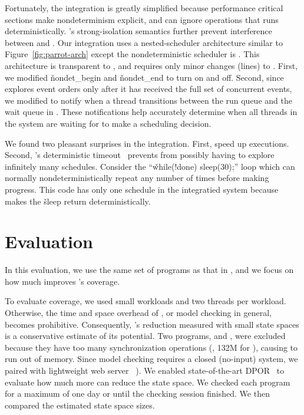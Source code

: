 Fortunately, the integration is greatly simplified because performance
critical sections make nondeterminism explicit, and \dbug can ignore
operations that \parrot runs deterministically.  \parrot's strong-isolation
semantics further prevent interference
between \parrot and \dbug.  Our integration uses a nested-scheduler
architecture similar to Figure~\ref{fig:parrot-arch} except the
nondeterministic scheduler is \dbug.  This architecture is transparent
to \dbug, and requires only minor changes (\locsmcmc lines) to \parrot.
First, we modified \v{nondet\_begin} and \v{nondet\_end} to turn \dbug
on and off.  Second, since \dbug explores event orders only after
it has received the full set of concurrent events, we modified
\parrot to notify \dbug when a thread transitions between the run queue
and the wait queue in \parrot. These notifications help \dbug accurately
determine when all threads in the system are waiting for \dbug to make
a scheduling decision.

We found two pleasant surprises in the
integration.  First, \computes speed up \dbug executions.  Second,
\parrot's deterministic timeout~\cite{parrot:sosp13} prevents \dbug from
possibly having to explore infinitely many schedules.  Consider the
``\v{while(!done) sleep(30);}'' loop which can normally
nondeterministically repeat any number of times before making
progress.  This code has only one schedule in the integratied system because \parrot
makes the \v{sleep} return deterministically.

\section{Evaluation} \label{sec:coverage}

In this evaluation, we use the same set of programs as that in \parrot, and we 
focus on how much \parrot improves \dbug's coverage.

To evaluate coverage, we used small workloads and two threads per workload.
Otherwise, the time and space overhead of \dbug,
or model checking in general, becomes prohibitive. Consequently, \parrot's
reduction measured with small state spaces is a conservative estimate of
its potential.  Two programs, \volrend and \ua, were excluded because they
have too many synchronization operations (\eg, 132M for \ua), causing
\dbug to run out of memory.  Since model checking requires a closed
(no-input) system, we paired \aget with lightweight web server
\mongoose~\cite{mongoose}).  We enabled
state-of-the-art DPOR~\cite{flanagan:dynamicpo} to evaluate how much more
\parrot can reduce the state space. We checked each program for a maximum of
one day or until the checking session finished.  We then compared the
estimated state space sizes.

